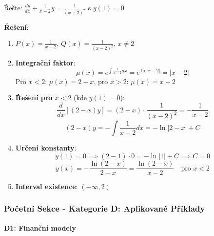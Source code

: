 \begin{example}
Řešte: $\frac{dy}{dx} + \frac{1}{x-2}y = \frac{1}{(x-2)^2}$ s $y(1) = 0$
\vspace{0.3\baselineskip}

\textbf{Řešení}: 
\begin{enumerate}
\item $P(x) = \frac{1}{x-2}$, $Q(x) = \frac{1}{(x-2)^2}$, $x \neq 2$

\item \textbf{Integrační faktor}:
\[
\mu(x) = e^{\int \frac{1}{x-2}dx} = e^{\ln|x-2|} = |x-2|
\]
Pro $x < 2$: $\mu(x) = 2-x$, pro $x > 2$: $\mu(x) = x-2$

\item \textbf{Řešení pro $x < 2$} (kde $y(1) = 0$):
\[
\frac{d}{dx}[(2-x)y] = (2-x)\cdot\frac{1}{(x-2)^2} = -\frac{1}{x-2}
\]
\[
(2-x)y = -\int \frac{1}{x-2}dx = -\ln|2-x| + C
\]

\item \textbf{Určení konstanty}:
\[
y(1) = 0 \implies (2-1)\cdot 0 = -\ln|1| + C \implies C = 0
\]
\[
y(x) = -\frac{\ln(2-x)}{2-x} = \frac{\ln(2-x)}{x-2} \quad \text{pro } x < 2
\]

\item \textbf{Interval existence}: $(-\infty, 2)$
\end{enumerate}
\end{example}

\vspace{0.8\baselineskip}

\subsubsection{Početní Sekce - Kategorie D: Aplikované Příklady}
\label{subsubsec:pocetni-kategorie-d}

\paragraph*{D1: Finanční modely}


